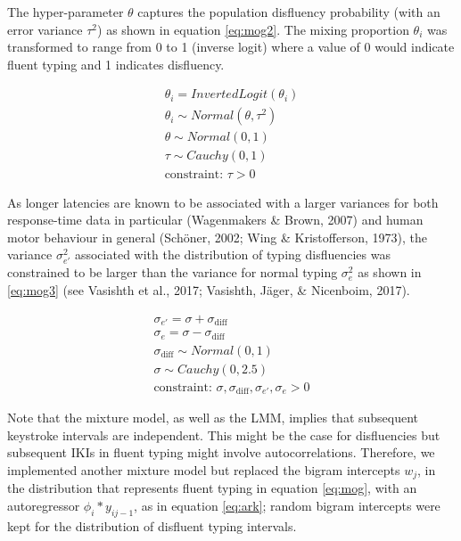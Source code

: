 \documentclass[english,man,floatsintext]{apa7}
\begin{document}
The hyper-parameter \(\theta\) captures the population disfluency probability (with an error variance \(\tau^2\)) as shown in equation \ref{eq:mog2}. The mixing proportion \(\theta_i\) was transformed to range from 0 to 1 (inverse logit) where a value of 0 would indicate fluent typing and 1 indicates disfluency.

\[
\tag{8}
\begin{aligned}
        \theta_i = InvertedLogit(\theta_i)\\
        \theta_i \sim Normal(\theta,\tau^2)\\
        \theta \sim Normal(0,1)\\
        \tau \sim Cauchy(0,1)\\
        \text{constraint: } \tau > 0
\end{aligned}   
\label{eq:mog2}
\]

As longer latencies are known to be associated with a larger variances for both response-time data in particular (Wagenmakers \& Brown, 2007) and human motor behaviour in general (Schöner, 2002; Wing \& Kristofferson, 1973), the variance \(\sigma_{e'}^2\) associated with the distribution of typing disfluencies was constrained to be larger than the variance for normal typing \(\sigma_e^2\) as shown in \ref{eq:mog3} (see Vasishth et al., 2017; Vasishth, Jäger, \& Nicenboim, 2017).

\[
\tag{9}
\begin{aligned}
        \sigma_{e'} = \sigma + \sigma_{\text{diff}}\\
        \sigma_{e} = \sigma - \sigma_{\text{diff}}\\
        \sigma_{\text{diff}} \sim Normal(0,1)\\
        \sigma \sim Cauchy(0,2.5)\\
        \text{constraint: } \sigma, \sigma_{\text{diff}}, \sigma_{e'}, \sigma_{e} > 0
\end{aligned}   
\label{eq:mog3}
\]

Note that the mixture model, as well as the LMM, implies that subsequent keystroke intervals are independent. This might be the case for disfluencies but subsequent IKIs in fluent typing might involve autocorrelations. Therefore, we implemented another mixture model but replaced the bigram intercepts \(w_j\), in the distribution that represents fluent typing in equation \ref{eq:mog}, with an autoregressor \(\phi_i*y_{ij-1}\), as in equation \ref{eq:ark}; random bigram intercepts were kept for the distribution of disfluent typing intervals.
\end{document}
